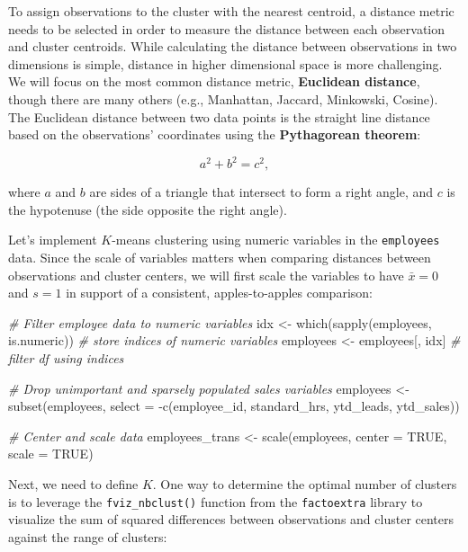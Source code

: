 \documentclass[
]{book}
\newenvironment{Shaded}{\begin{snugshade}}{\end{snugshade}}
\newcommand{\AttributeTok}[1]{\textcolor[rgb]{0.77,0.63,0.00}{#1}}
\newcommand{\CommentTok}[1]{\textcolor[rgb]{0.56,0.35,0.01}{\textit{#1}}}
\newcommand{\ConstantTok}[1]{\textcolor[rgb]{0.00,0.00,0.00}{#1}}
\newcommand{\FunctionTok}[1]{\textcolor[rgb]{0.00,0.00,0.00}{#1}}
\newcommand{\NormalTok}[1]{#1}
\newcommand{\OtherTok}[1]{\textcolor[rgb]{0.56,0.35,0.01}{#1}}
\newcommand{\SpecialCharTok}[1]{\textcolor[rgb]{0.00,0.00,0.00}{#1}}
\begin{document}
To assign observations to the cluster with the nearest centroid, a distance metric needs to be selected in order to measure the distance between each observation and cluster centroids. While calculating the distance between observations in two dimensions is simple, distance in higher dimensional space is more challenging. We will focus on the most common distance metric, \textbf{Euclidean distance}, though there are many others (e.g., Manhattan, Jaccard, Minkowski, Cosine). The Euclidean distance between two data points is the straight line distance based on the observations' coordinates using the \textbf{Pythagorean theorem}:

\[ a^2 + b^2 = c^2, \]

where \(a\) and \(b\) are sides of a triangle that intersect to form a right angle, and \(c\) is the hypotenuse (the side opposite the right angle).

Let's implement \(K\)-means clustering using numeric variables in the \texttt{employees} data. Since the scale of variables matters when comparing distances between observations and cluster centers, we will first scale the variables to have \(\bar{x} = 0\) and \(s = 1\) in support of a consistent, apples-to-apples comparison:

\begin{Shaded}
\begin{Highlighting}[]
\CommentTok{\# Filter employee data to numeric variables}
\NormalTok{idx }\OtherTok{\textless{}{-}} \FunctionTok{which}\NormalTok{(}\FunctionTok{sapply}\NormalTok{(employees, is.numeric)) }\CommentTok{\# store indices of numeric variables}
\NormalTok{employees }\OtherTok{\textless{}{-}}\NormalTok{ employees[, idx] }\CommentTok{\# filter df using indices}

\CommentTok{\# Drop unimportant and sparsely populated sales variables}
\NormalTok{employees }\OtherTok{\textless{}{-}} \FunctionTok{subset}\NormalTok{(employees, }\AttributeTok{select =} \SpecialCharTok{{-}}\FunctionTok{c}\NormalTok{(employee\_id, standard\_hrs, ytd\_leads, ytd\_sales))}

\CommentTok{\# Center and scale data}
\NormalTok{employees\_trans }\OtherTok{\textless{}{-}} \FunctionTok{scale}\NormalTok{(employees, }\AttributeTok{center =} \ConstantTok{TRUE}\NormalTok{, }\AttributeTok{scale =} \ConstantTok{TRUE}\NormalTok{)}
\end{Highlighting}
\end{Shaded}

Next, we need to define \(K\). One way to determine the optimal number of clusters is to leverage the \texttt{fviz\_nbclust()} function from the \texttt{factoextra} library to visualize the sum of squared differences between observations and cluster centers against the range of clusters:
\end{document}
